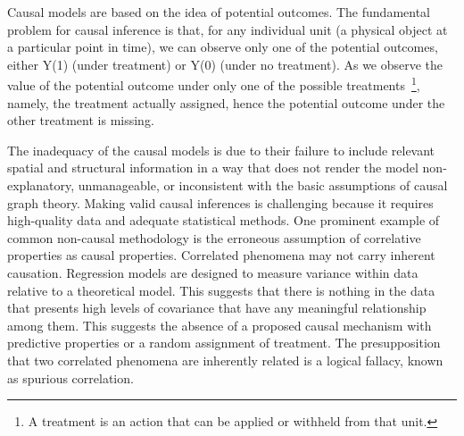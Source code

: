 \documentclass[%
 aps,
 jmp,%
 amsmath,amssymb,
 reprint,%
]{revtex4-2}
\begin{document}

Causal models are based on the idea of potential outcomes. 
The fundamental problem for causal inference is that, for any individual unit (a physical object at a particular point in time), we can observe only one of the potential outcomes, either Y(1) (under treatment) or Y(0) (under no treatment). 
As we observe the value of the potential outcome under only one of the possible treatments~\footnote{A treatment is an action that can be applied or withheld from that unit.}, namely, the treatment actually assigned, hence the potential outcome under the other treatment is missing.

The inadequacy of the causal models is due to their failure to include relevant spatial and structural information in a way that does not render the model non-explanatory, unmanageable, or inconsistent with the basic assumptions of causal graph theory. 
Making valid causal inferences is challenging because it requires high-quality data and adequate statistical methods. 
One prominent example of common non-causal methodology is the erroneous assumption of correlative properties as causal properties. 
Correlated phenomena may not carry inherent causation. 
Regression models are designed to measure variance within data relative to a theoretical model. 
This suggests that there is nothing in the data that presents high levels of covariance that have any meaningful relationship among them. 
This suggests the absence of a proposed causal mechanism with predictive properties or a random assignment of treatment. 
The presupposition that two correlated phenomena are inherently related is a logical fallacy, known as spurious correlation.
\end{document}
